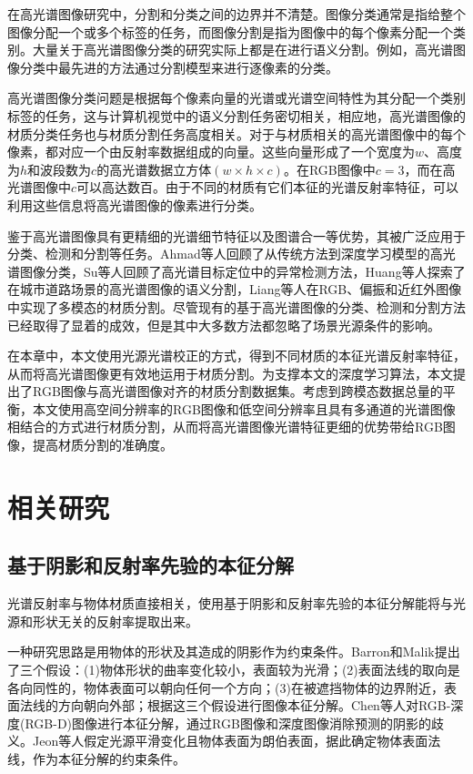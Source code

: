 \documentclass[
    type = master, %
    degree = academic,        %
    decl-page,  %
  ]{njuthesis}
\begin{document}
在高光谱图像研究中，分割和分类之间的边界并不清楚。图像分类通常是指给整个图像分配一个或多个标签的任务，而图像分割是指为图像中的每个像素分配一个类别。大量关于高光谱图像分类的研究实际上都是在进行语义分割。例如，高光谱图像分类\cite{S18,S19,S2}中最先进的方法通过分割模型来进行逐像素的分类。

高光谱图像分类问题是根据每个像素向量的光谱或光谱空间特性为其分配一个类别标签的任务，这与计算机视觉中的语义分割任务密切相关，相应地，高光谱图像的材质分类任务也与材质分割任务高度相关。对于与材质相关的高光谱图像中的每个像素，都对应一个由反射率数据组成的向量。这些向量形成了一个宽度为$w$、高度为$h$和波段数为$c$的高光谱数据立方体$(w\times h\times c)$。在RGB图像中$c = 3$，而在高光谱图像中$c$可以高达数百。由于不同的材质有它们本征的光谱反射率特征，可以利用这些信息将高光谱图像的像素进行分类。

鉴于高光谱图像具有更精细的光谱细节特征以及图谱合一等优势，其被广泛应用于分类、检测和分割等任务。Ahmad等人\cite{ahmad2021hyperspectral}回顾了从传统方法到深度学习模型的高光谱图像分类，Su等人\cite{su2021hyperspectral}回顾了高光谱目标定位中的异常检测方法，Huang等人\cite{huang2021weakly}探索了在城市道路场景的高光谱图像的语义分割，Liang等人\cite{liang2022multimodal}在RGB、偏振和近红外图像中实现了多模态的材质分割。尽管现有的基于高光谱图像的分类、检测和分割方法已经取得了显着的成效，但是其中大多数方法都忽略了场景光源条件的影响。

在本章中，本文使用光源光谱校正的方式，得到不同材质的本征光谱反射率特征，从而将高光谱图像更有效地运用于材质分割。为支撑本文的深度学习算法，本文提出了RGB图像与高光谱图像对齐的材质分割数据集。考虑到跨模态数据总量的平衡，本文使用高空间分辨率的RGB图像和低空间分辨率且具有多通道的光谱图像相结合的方式进行材质分割，从而将高光谱图像光谱特征更细的优势带给RGB图像，提高材质分割的准确度。



\section{相关研究 }
\subsection{基于阴影和反射率先验的本征分解}
光谱反射率与物体材质直接相关，使用基于阴影和反射率先验的本征分解能将与光源和形状无关的反射率提取出来。

一种研究思路是用物体的形状及其造成的阴影作为约束条件。Barron和Malik\cite{IID1,IID2,IID3}提出了三个假设：(1)物体形状的曲率变化较小，表面较为光滑；(2)表面法线的取向是各向同性的，物体表面可以朝向任何一个方向；(3)在被遮挡物体的边界附近，表面法线的方向朝向外部；根据这三个假设进行图像本征分解。Chen等人\cite{IID7}对RGB-深度(RGB-D)图像进行本征分解，通过RGB图像和深度图像消除预测的阴影的歧义。Jeon等人\cite{IID13}假定光源平滑变化且物体表面为朗伯表面，据此确定物体表面法线，作为本征分解的约束条件。
\end{document}
